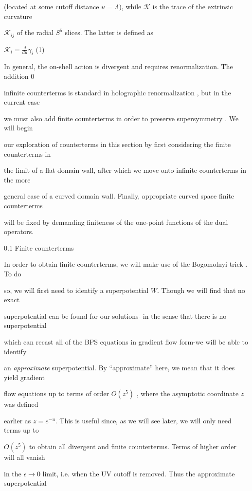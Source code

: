\documentclass[a4paper,12pt]{article}
\begin{document}
(located at some cutoff distance $ u=\Lambda$), while $\mathcal{K}$ is the trace of the extrinsic curvature

$\mathcal{K}_{ij}$ of the radial $S^{5}$ slices. The latter is defined as
\begin{center}
$\displaystyle \mathcal{K}_{i}=\frac{d}{du}\gamma_{i}$   (1)
\end{center}
In general, the on-shell action is divergent and requires renormalization. The addition $0$

infinite counterterms is standard in holographic renormalization , but in the current case

we must also add finite counterterms in order to preserve supersymmetry . We will begin

our exploration of counterterms in this section by first considering the finite counterterms in

the limit of a flat domain wall, after which we move onto infinite counterterms in the more

general case of a curved domain wall. Finally, appropriate curved space finite counterterms

will be fixed by demanding finiteness of the one-point functions of the dual operators.

0.1 Finite counterterms

In order to obtain finite counterterms, we will make use of the Bogomolnyi trick . To do

so, we will first need to identify a superpotential $W$. Though we will find that no exact

superpotential can be found for our solutions- in the sense that there is no superpotential

which can recast all of the BPS equations in gradient flow form-we will be able to identify

an {\it approximate} superpotential. By ``approximate'' here, we mean that it does yield gradient

flow equations up to terms of order $O(z^{5})$ , where the asymptotic coordinate $z$ was defined

earlier as $z=e^{-u}$. This is useful since, as we will see later, we will only need terms up to

$O(z^{5})$ to obtain all divergent and finite counterterms. Terms of higher order will all vanish

in the $\epsilon\rightarrow 0$ limit, i.e. when the UV cutoff is removed. Thus the approximate superpotential
\end{document}
